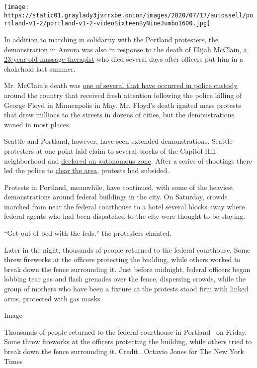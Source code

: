 \texttt{[image: https://static01.graylady3jvrrxbe.onion/images/2020/07/17/autossell/portland-v1-2/portland-v1-2-videoSixteenByNineJumbo1600.jpg]}

In addition to marching in solidarity with the Portland protesters, the
demonstration in Aurora was also in response to the death of
\href{https://www.nytimes3xbfgragh.onion/article/who-was-elijah-mcclain.html}{Elijah
McClain, a 23-year-old massage therapist} who died several days after
officers put him in a chokehold last summer.

Mr. McClain's death was
\href{https://www.nytimes3xbfgragh.onion/2020/06/20/us/elijah-mcclain-police-killings.html}{one
of several that have occurred in police custody} around the country that
received fresh attention following the police killing of George Floyd in
Minneapolis in May. Mr. Floyd's death ignited mass protests that drew
millions to the streets in dozens of cities, but the demonstrations
waned in most places.

Seattle and Portland, however, have seen extended demonstrations.
Seattle protesters at one point laid claim to several blocks of the
Capitol Hill neighborhood and
\href{https://www.nytimes3xbfgragh.onion/2020/06/11/us/seattle-autonomous-zone.html}{declared
an autonomous zone}. After a series of shootings there led the police to
\href{https://www.nytimes3xbfgragh.onion/2020/07/01/us/seattle-protest-zone-CHOP-CHAZ-unrest.html}{clear
the area}, protests had subsided.

Protests in Portland, meanwhile, have continued, with some of the
heaviest demonstrations around federal buildings in the city. On
Saturday, crowds marched from near the federal courthouse to a hotel
several blocks away where federal agents who had been dispatched to the
city were thought to be staying.

``Get out of bed with the feds,'' the protesters chanted.

Later in the night, thousands of people returned to the federal
courthouse. Some threw fireworks at the officers protecting the
building, while others worked to break down the fence surrounding it.
Just before midnight, federal officers began lobbing tear gas and flash
grenades over the fence, dispersing crowds, while the group of mothers
who have been a fixture at the protests stood firm with linked arms,
protected with gas masks.

Image

Thousands of people returned to the federal courthouse in Portland~ on
Friday. Some threw fireworks at the officers protecting the building,
while others tried to break down the fence surrounding it.
Credit...Octavio Jones for The New York Times

